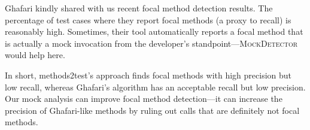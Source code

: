 Ghafari kindly shared with us recent focal method detection results. The percentage of test cases where they report focal methods (a proxy to recall) is reasonably high. Sometimes, their tool automatically reports a focal method that is actually a mock invocation from the developer's standpoint---\textsc{MockDetector} would help here. 

In short, methods2test's approach finds focal methods with high precision but low recall, whereas Ghafari's algorithm has an acceptable recall but low precision. Our mock analysis can improve focal method detection---it can increase the precision of Ghafari-like methods by ruling out calls that are definitely not focal methods.

